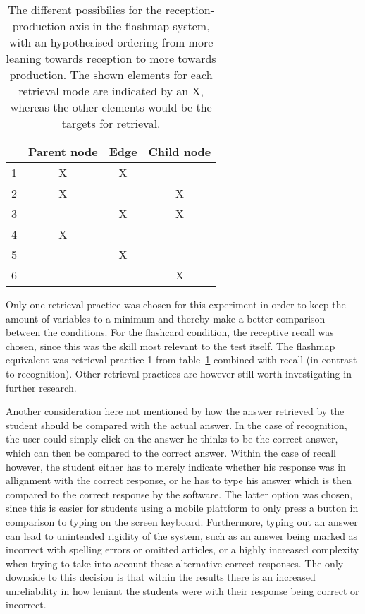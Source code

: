 \begin{table}
    \centering
    \begin{tabular}{lccc}
        \hline
         & Parent node & Edge & Child node \\
        \hline
        1 & X & X & \\
        2 & X & & X \\
        3 &  & X & X \\
        4 & X & & \\
        5 &  & X & \\
        6 &  & & X \\
        \hline
    \end{tabular}
    \caption{The different possibilies for the reception-production axis in the flashmap system, with an hypothesised ordering from more leaning towards reception to more towards production. The shown elements for each retrieval mode are indicated by an X, whereas the other elements would be the targets for retrieval.}
    \label{tab:retrievalmaps}
\end{table}

Only one retrieval practice was chosen for this experiment in order to keep the amount of variables to a minimum and thereby make a better comparison between the conditions. For the flashcard condition, the receptive recall was chosen, since this was the skill most relevant to the test itself. The flashmap equivalent was retrieval practice 1 from table~\ref{tab:retrievalmaps} combined with recall (in contrast to recognition). Other retrieval practices are however still worth investigating in further research.

Another consideration here not mentioned by  how the answer retrieved by the student should be compared with the actual answer. In the case of recognition, the user could simply click on the answer he thinks to be the correct answer, which can then be compared to the correct answer. Within the case of recall however, the student either has to merely indicate whether his response was in allignment with the correct response, or he has to type his answer which is then compared to the correct response by the software. The latter option was chosen, since this is easier for students using a mobile plattform to only press a button in comparison to typing on the screen keyboard. Furthermore, typing out an answer can lead to unintended rigidity of the system, such as an answer being marked as incorrect with spelling errors or omitted articles, or a highly increased complexity when trying to take into account these alternative correct responses. The only downside to this decision is that within the results there is an increased unreliability in how leniant the students were with their response being correct or incorrect.

